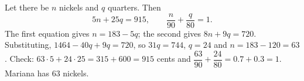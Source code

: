 Let there be $n$ nickels and $q$ quarters. Then
\[
5n+25q=915,\qquad \dfrac {n}{90}+\dfrac {q}{80}=1 .
\]
The first equation gives $n=183-5q$; the second gives $8n+9q=720$. Substituting, $1464-40q+9q=720$, so $31q=744$, $q=24$ and $n=183-120=63$. Check: $63\cdot5+24\cdot25=315+600=915$ cents and $\dfrac{63}{90}+\dfrac{24}{80}=0.7+0.3=1$. Mariana has $\boxed{63}$ nickels.
